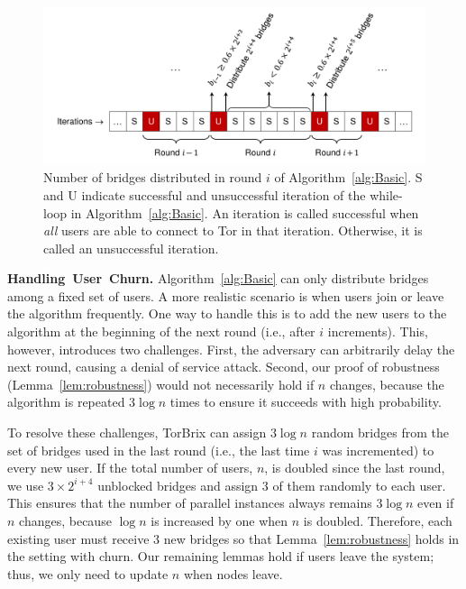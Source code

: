 \documentclass[letterpaper,twocolumn,10pt]{article}
\newcommand{\ie}{i.e.}
\newcommand{\jared}[1]{}
\newcommand{\sfsize}{\fontsize{0.73\baselineskip}{0.73\baselineskip}\selectfont}
\newcommand{\sans}[1]{\textsf{\sfsize \mbox{#1}}}
\newcommand{\sansb}[1]{\textbf{\sans{\mbox{#1}}}}
\newcommand{\para}[1]{\vspace{0.55em} \noindent \sansb{{\mbox{#1}}}}
\newcommand{\brix}{\sans{TorBrix}\xspace}
\begin{document}
\begin{figure}
	\centering
	\includegraphics[width=1.035\linewidth]{images/rounds}
	\caption{Number of bridges distributed in round $i$ of Algorithm~\ref{alg:Basic}. S and U indicate successful and unsuccessful iteration of the while-loop in Algorithm~\ref{alg:Basic}. An iteration is called successful when \emph{all} users are able to connect to Tor in that iteration. Otherwise, it is called an unsuccessful iteration. }
	\label{fig:rounds}
\end{figure}

\para{Handling User Churn.} \label{sec:churn}
Algorithm~\ref{alg:Basic} can only distribute bridges among a fixed set of users. A more realistic scenario is when users join or leave the algorithm frequently. One way to handle this is to add the new users to the algorithm at the beginning of the next round (\ie, after $i$ increments). This, however, introduces two challenges. First, the adversary can arbitrarily delay the next round, causing a denial of service attack. Second, our proof of robustness (Lemma~\ref{lem:robustness}) would not necessarily hold if $n$ changes, because the algorithm is repeated $3\log{n}$ times to ensure it succeeds with high probability.

To resolve these challenges, \brix can assign $3\log{n}$ random bridges from the set of bridges used in the last round (\ie, the last time $i$ was incremented) to every new user.  If the total number of users, $n$, is doubled since the last round, we use $3 \times 2^{i+4}$ unblocked bridges and assign $3$ of them randomly to each user.  This ensures that the number of parallel instances always remains $3\log{n}$ even if $n$ changes, because $\log{n}$ is increased by one when $n$ is doubled. Therefore, each existing user must receive $3$ new bridges so that Lemma~\ref{lem:robustness} holds in the setting with churn.\jared{This last sentence is confusing.  Are you suggesting another change to the algorithm, or is this to justify the previous change?} Our remaining lemmas hold if users leave the system; thus, we only need to update $n$ when nodes leave.
\end{document}
